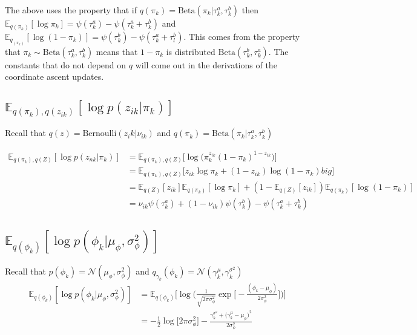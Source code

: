 \documentclass[11pt]{article}
\theoremstyle{definition}
\theoremstyle{plain}
\newcommand{\E}{\mathbb{E}}
\newcommand{\Beta}{\text{Beta}}
\newcommand{\Bernoulli}{\text{Bernoulli}}
\begin{document}
\noindent The above uses the property that if $q(\pi_k) = \Beta(\pi_k|\tau_k^a,\tau_k^b)$
then $\E_{q(\pi_k)}[\log \pi_k] = \psi(\tau_k^a) - \psi(\tau_k^a + \tau_k^b)$
and $\E_{q_(\pi_k)}[\log (1 - \pi_k)] = \psi(\tau_k^b) - \psi(\tau_k^a + \tau_l^b)$.
This comes from the property that $\pi_k \sim \Beta(\tau_k^a,\tau_k^b)$ means
that $1 - \pi_k$ is distributed $\Beta(\tau_k^b,\tau_k^a)$. The constants that
do not depend on $q$ will come out in the derivations of the coordinate ascent updates.

\subsection{$\E_{q(\pi_k),q(z_{ik})}[\log p(z_{ik}|\pi_k)]$}

\noindent Recall that $q(z) = \Bernoulli(z_ik|\nu_{ik})$ and $q(\pi_k) = \Beta(\pi_k|\tau_k^a,\tau_k^b)$

\begin{align*}
    \E_{q(\pi_k),q(Z)}[\log p (z_{nk}|\pi_k)] 
        &= \E_{q(\pi_k),q(Z)}\big[\log \big(\pi_k^{z_{ik}}(1 - \pi_k)^{1 - z_{ik}}\big)\big]\\
        &= \E_{q(\pi_k),q(Z)}\big[ z_{ik} \log \pi_k + (1 - z_{ik})\log(1 - \pi_k) big]\\
        &= \E_{q(Z)}[z_{ik}] \E_{q(\pi_k)}[\log \pi_k] +  
            (1 - \E_{q(Z)}[z_{ik}]) \E_{q(\pi_k)}[\log(1 - \pi_k)]\\
        &= \nu_{ik} \psi(\tau_k^a) + (1 - \nu_{ik})\psi(\tau_k^b) - \psi(\tau_k^a + \tau_k^b)
\end{align*}






\subsection{$\E_{q(\phi_k)}[\log p(\phi_k|\mu_{\phi},\sigma^2_\phi)]$}


\noindent Recall that $p(\phi_k) = \mathcal{N}(\mu_{\phi},\sigma^2_{\phi})$
and $q_{\gamma_k}(\phi_k) = 
\mathcal{N}(\gamma_{k}^{\mu}, \gamma_{k}^{\sigma^2})$\\

\begin{align*}
    \E_{q(\phi_k)}[\log p(\phi_k|\mu_{\phi},\sigma^2_\phi)] &=
        \E_{q(\phi_k)}
            \Big[%
            \log \Big(%
                \frac{1}{\sqrt{2 \pi \sigma^2_\phi}} \exp 
                \big[-\frac{(\phi_k - \mu_{\phi})}{2 \sigma^2_\phi}\big]
            \Big)%
            \Big]%
            \\
       &= -\frac{1}{2} \log \Big[2 \pi \sigma^2_{\phi} \Big]
          - \frac{\gamma_{k}^{\sigma^2} + \big(\gamma_k^{\mu} - 
          \mu_{\phi} \big)^2}{2 \sigma^2_{\phi}}
\end{align*}
\end{document}
